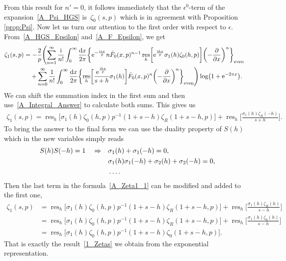 \documentclass[pdftex]{sigma}
\numberwithin{equation}{section}
\DeclareMathOperator{\res}{res}
\begin{document}
From this result for $n'=0$, it follows immediately that the $\epsilon^0$-term of the expansion~\eqref{A_Psi_HGS} is~$\zeta_0(s, p)$ which is in agreement with Proposition \ref{prop:Psi}. Now let us turn our attention to the first order with respect to $\epsilon$. From~\eqref{A_HGS_Epsilon} and~\eqref{A_F_Epsilon}, we get
\begin{align*}
\zeta_1(s, p)
&=-\frac{2}{p}\Biggl( \sum_{n=1}^{\infty} \frac{{\rm i}}{n!} \int_{0}^{\infty} \frac{{\rm d}x}{2\pi}
\biggl\{
    {\rm e}^{-\frac{{\rm i}sx}{p}} n \bar{F}_0(x, p)^{n-1} \res_h\biggl[ {\rm e}^{\frac{{\rm i}hx}{p}} \sigma_1(h)\zeta_0(h, p) \biggr]
    \biggl(-\frac{\partial}{\partial x}\biggr)^{n}
\biggr\}_{\text{even}}\cr
&\quad{}+\sum_{n=0}^{\infty} \frac{1}{n!} \int_{0}^{\infty} \frac{{\rm d}x}{2\pi}
\biggl\{
    \res_h\biggl[\frac{{\rm e}^{\frac{{\rm i}hx}{p}}}{s+h}\sigma_1(h)\biggr] \bar{F}_0(x, p)^n
    \biggl(-\frac{\partial}{\partial x}\biggr)^{n}
\biggr\}_{\text{even}}\Biggr) \log\bigl(1+{\rm e}^{-2\pi x}\bigr).
\end{align*}
We can shift the summation index in the first sum and then use~\eqref{A_Integral_Answer} to calculate both sums. This gives us
\begin{align}\label{A_Zeta1_1}
\zeta_1(s, p)=\res_h\big[ \sigma_1(h)\zeta_0(h, p) p^{-1} (1+s-h) \zeta_R(1+s-h, p) \big] + \res_h\biggl[ \frac{\sigma_1(h)\zeta_R(-h)}{s+h} \biggr].
\end{align}
To bring the answer to the final form we can use the duality property of $S(h)$ which in the new variables simply reads
\begin{align}
S(h)S(-h)=1 \quad\Rightarrow\quad &\sigma_1(h)+\sigma_1(-h)=0, \nonumber\\
                             &\sigma_1(h)\sigma_1(-h)+\sigma_2(h)+\sigma_2(-h)=0, \cr
                             &\ldots.\label{A_S_Duality}
\end{align}
Then the last term in the formula~\eqref{A_Zeta1_1} can be modified and added to the first one,
\begin{align*}
\zeta_1(s, p)&{}=\res_h\bigl[ \sigma_1(h)\zeta_0(h, p) p^{-1} (1+s-h) \zeta_R(1+s-h, p) \bigr] + \res_h\biggl[ \frac{\sigma_1(h)\zeta_R(h)}{s-h} \biggr]  \\
&{}=\res_h\bigl[ \sigma_1(h)\zeta_0(h, p) p^{-1} (1+s-h) \zeta_R(1+s-h, p) \bigr] + \res_h\biggl[ \frac{\sigma_1(h)\zeta_0(h)}{s-h} \biggr]\\
&{}=\res_h\bigl[ \sigma_1(h)\zeta_0(h, p) p^{-1} (1+s-h) \zeta_0(1+s-h, p) \bigr].
\end{align*}
That is exactly the result~\eqref{1_Zetas} we obtain from the exponential representation.
\end{document}
